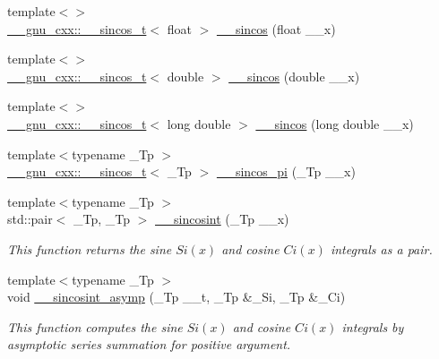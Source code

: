 \begin{DoxyCompactItemize}
\item 
{\footnotesize template$<$$>$ }\\\hyperlink{struct____gnu__cxx_1_1____sincos__t}{\+\_\+\+\_\+gnu\+\_\+cxx\+::\+\_\+\+\_\+sincos\+\_\+t}$<$ float $>$ \hyperlink{namespacestd_1_1____detail_a8cfd8b8345ebc359e31ac1631e29aeea}{\+\_\+\+\_\+sincos} (float \+\_\+\+\_\+x)
\item 
{\footnotesize template$<$$>$ }\\\hyperlink{struct____gnu__cxx_1_1____sincos__t}{\+\_\+\+\_\+gnu\+\_\+cxx\+::\+\_\+\+\_\+sincos\+\_\+t}$<$ double $>$ \hyperlink{namespacestd_1_1____detail_a76c185b3a0156ecf557afdbf552a8916}{\+\_\+\+\_\+sincos} (double \+\_\+\+\_\+x)
\item 
{\footnotesize template$<$$>$ }\\\hyperlink{struct____gnu__cxx_1_1____sincos__t}{\+\_\+\+\_\+gnu\+\_\+cxx\+::\+\_\+\+\_\+sincos\+\_\+t}$<$ long double $>$ \hyperlink{namespacestd_1_1____detail_aade98e6318f4459f37e1f79f4c871cf6}{\+\_\+\+\_\+sincos} (long double \+\_\+\+\_\+x)
\item 
{\footnotesize template$<$typename \+\_\+\+Tp $>$ }\\\hyperlink{struct____gnu__cxx_1_1____sincos__t}{\+\_\+\+\_\+gnu\+\_\+cxx\+::\+\_\+\+\_\+sincos\+\_\+t}$<$ \+\_\+\+Tp $>$ \hyperlink{namespacestd_1_1____detail_af17af8caca5ba47597cc314e93ba49cd}{\+\_\+\+\_\+sincos\+\_\+pi} (\+\_\+\+Tp \+\_\+\+\_\+x)
\item 
{\footnotesize template$<$typename \+\_\+\+Tp $>$ }\\std\+::pair$<$ \+\_\+\+Tp, \+\_\+\+Tp $>$ \hyperlink{namespacestd_1_1____detail_a53bf807a99eef68cdb6f917c7ca085bf}{\+\_\+\+\_\+sincosint} (\+\_\+\+Tp \+\_\+\+\_\+x)
\begin{DoxyCompactList}\small\item\em This function returns the sine $ Si(x) $ and cosine $ Ci(x) $ integrals as a {\ttfamily pair}. \end{DoxyCompactList}\item 
{\footnotesize template$<$typename \+\_\+\+Tp $>$ }\\void \hyperlink{namespacestd_1_1____detail_a976c3ff52c54001de3d409900c9bcb9c}{\+\_\+\+\_\+sincosint\+\_\+asymp} (\+\_\+\+Tp \+\_\+\+\_\+t, \+\_\+\+Tp \&\+\_\+\+Si, \+\_\+\+Tp \&\+\_\+\+Ci)
\begin{DoxyCompactList}\small\item\em This function computes the sine $ Si(x) $ and cosine $ Ci(x) $ integrals by asymptotic series summation for positive argument. \end{DoxyCompactList}\item 

\end{DoxyCompactItemize}
